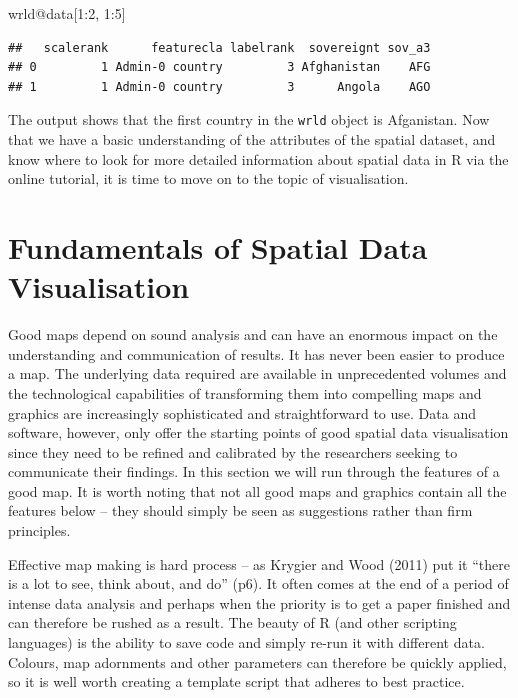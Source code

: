 \documentclass[]{article}
\newenvironment{Shaded}{}{}
\newcommand{\DecValTok}[1]{\textcolor[rgb]{0.25,0.63,0.44}{{#1}}}
\newcommand{\NormalTok}[1]{{#1}}
\begin{document}
\begin{Shaded}
\begin{Highlighting}[]
\NormalTok{wrld@data[}\DecValTok{1}\NormalTok{:}\DecValTok{2}\NormalTok{, }\DecValTok{1}\NormalTok{:}\DecValTok{5}\NormalTok{]}
\end{Highlighting}
\end{Shaded}

\begin{verbatim}
##   scalerank      featurecla labelrank  sovereignt sov_a3
## 0         1 Admin-0 country         3 Afghanistan    AFG
## 1         1 Admin-0 country         3      Angola    AGO
\end{verbatim}

The output shows that the first country in the \texttt{wrld} object is
Afganistan. Now that we have a basic understanding of the attributes of
the spatial dataset, and know where to look for more detailed
information about spatial data in R via the online tutorial, it is time
to move on to the topic of visualisation.

\section{Fundamentals of Spatial Data Visualisation}

Good maps depend on sound analysis and can have an enormous impact on
the understanding and communication of results. It has never been easier
to produce a map. The underlying data required are available in
unprecedented volumes and the technological capabilities of transforming
them into compelling maps and graphics are increasingly sophisticated
and straightforward to use. Data and software, however, only offer the
starting points of good spatial data visualisation since they need to be
refined and calibrated by the researchers seeking to communicate their
findings. In this section we will run through the features of a good
map. It is worth noting that not all good maps and graphics contain all
the features below -- they should simply be seen as suggestions rather
than firm principles.

Effective map making is hard process -- as Krygier and Wood (2011) put
it ``there is a lot to see, think about, and do'' (p6). It often comes
at the end of a period of intense data analysis and perhaps when the
priority is to get a paper finished and can therefore be rushed as a
result. The beauty of R (and other scripting languages) is the ability
to save code and simply re-run it with different data. Colours, map
adornments and other parameters can therefore be quickly applied, so it
is well worth creating a template script that adheres to best practice.
\end{document}

